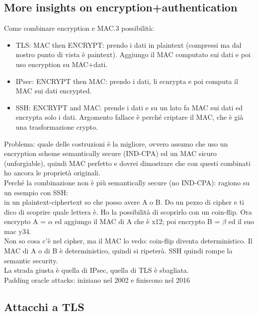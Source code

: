 \documentclass[16px]{article}
\begin{document}
\subsection{More insights on encryption+authentication}
Come combinare encryption e MAC.3 possibilità:
\begin{itemize}
\item TLS: MAC then ENCRYPT: prendo i dati in plaintext (compressi ma dal nostro punto di vista è paintext). Aggiungo il MAC computato sui dati e poi uso encryption su MAC+dati.
\item IPsec: ENCRYPT then MAC: prendo i dati, li ecnrypta e poi computa il MAC sui dati encrypted.
\item SSH: ENCRYPT and MAC: prende i dati e su un lato fa MAC sui dati ed encrypta solo i dati. Argomento fallace è perché criptare il MAC, che è già una trasformazione crypto.
\end{itemize}
Problema: quale delle costruzioni è la migliore, ovvero assumo che uso un encryption scheme semantically secure (IND-CPA) ed un MAC sicuro (unforgiable), quindi MAC perfetto e dovrei dimostrare che con questi combinati ho ancora le proprietà originali.\\ Perché la combinazione non è più semantically secure (no IND-CPA): ragiono su un esempio con SSH: \\in un plaintext-ciphertext so che posso avere A o B. Do un pezzo di cipher e ti dico di scoprire quale lettera è. Ho la possibilità di scoprirlo con un coin-flip. Ora encrypto A = $\alpha$ ed aggiungo il MAC di A che è x12; poi encrypto B = $\beta$ ed il suo mac y34.\\ Non so cosa c'è nel cipher, ma il MAC lo vedo: coin-flip diventa deterministico. Il MAC di A o di B è deterministico, quindi si ripeterà. SSH quindi rompe la semantic security.\\ La strada giusta è quella di IPsec, quella di TLS è sbagliata.\\ Padding oracle attacks: iniziano nel 2002 e finiscono nel 2016
\subsection{Attacchi a TLS}
\end{document}
